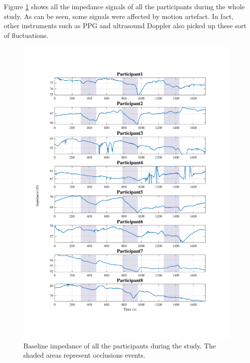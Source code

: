 
Figure \ref{fig:rb:all_participants} shows all the impedance signals of all the participants during the whole study. As can be seen, some signals were affected by motion artefact. In fact, other instruments such as PPG and ultrasound Doppler also picked up these sort of fluctuations. 

\begin{figure}
	\includegraphics[width=\textwidth,height=\textheight,keepaspectratio]{figure1}    
	\caption{Baseline impedance of all the participants during the study. The shaded areas represent occlusions events.}
	\label{fig:rb:all_participants}
\end{figure}

